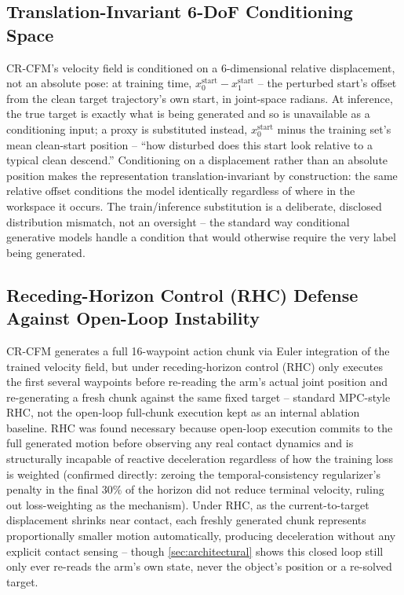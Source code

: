 \documentclass[]{interact}
\begin{document}
\subsection{Translation-Invariant 6-DoF Conditioning Space}
CR-CFM's velocity field is conditioned on a 6-dimensional relative displacement, not an absolute
pose: at training time, $x_0^{\text{start}} - x_1^{\text{start}}$ -- the perturbed start's offset
from the clean target trajectory's own start, in joint-space radians. At inference, the true
target is exactly what is being generated and so is unavailable as a conditioning input; a proxy
is substituted instead, $x_0^{\text{start}}$ minus the training set's mean clean-start position --
``how disturbed does this start look relative to a typical clean descend.'' Conditioning on a
displacement rather than an absolute position makes the representation translation-invariant by
construction: the same relative offset conditions the model identically regardless of where in
the workspace it occurs. The train/inference substitution is a deliberate, disclosed distribution
mismatch, not an oversight -- the standard way conditional generative models handle a condition
that would otherwise require the very label being generated.

\subsection{Receding-Horizon Control (RHC) Defense Against Open-Loop Instability}
CR-CFM generates a full 16-waypoint action chunk via Euler integration of the trained velocity
field, but under receding-horizon control (RHC) only executes the first several waypoints before
re-reading the arm's actual joint position and re-generating a fresh chunk against the same fixed
target -- standard MPC-style RHC, not the open-loop full-chunk execution kept as an internal
ablation baseline. RHC was found necessary because open-loop execution commits to the full
generated motion before observing any real contact dynamics and is structurally incapable of
reactive deceleration regardless of how the training loss is weighted (confirmed directly: zeroing
the temporal-consistency regularizer's penalty in the final $30\%$ of the horizon did not reduce
terminal velocity, ruling out loss-weighting as the mechanism). Under RHC, as the current-to-target
displacement shrinks near contact, each freshly generated chunk represents proportionally smaller
motion automatically, producing deceleration without any explicit contact sensing -- though
\cref{sec:architectural} shows this closed loop still only ever re-reads the arm's own state, never
the object's position or a re-solved target.
\end{document}
